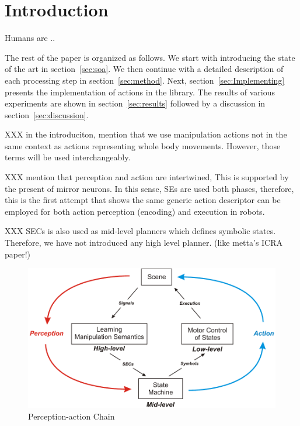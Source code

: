 \section{Introduction}


Humans are  ..
 
The rest of the paper is organized as follows. We start with introducing the state of the art in  section~\ref{sec:soa}. We then continue with a detailed description of each processing step in  section~\ref{sec:method}. 
Next, section~\ref{sec:Implementing} presents the implementation of actions in the library.
The results of various experiments are shown in section~\ref{sec:results} followed by a discussion in  section~\ref{sec:discussion}.


XXX in the introduciton, mention that we use manipulation actions not in the same context as actions representing whole body movements. However, those terms will be used interchangeably. 

XXX mention that perception and action are intertwined, This is supported by the present of mirror neurons. In this sense, SEs are used both phases, therefore, this is the first attempt that shows the same generic action descriptor can be employed for both action perception (encoding) and execution in robots. 

XXX SECs is also used as mid-level planners which defines symbolic states. Therefore, we have not introduced any high level planner. (like metta's ICRA paper!)


\begin{figure}[hb]
      \centering
      \includegraphics[scale=0.5]{./pdf/Figure_PerceptionAction.pdf}
      \caption{ Perception-action Chain}
      \label{fig:action_graph_sec}
\end{figure}

